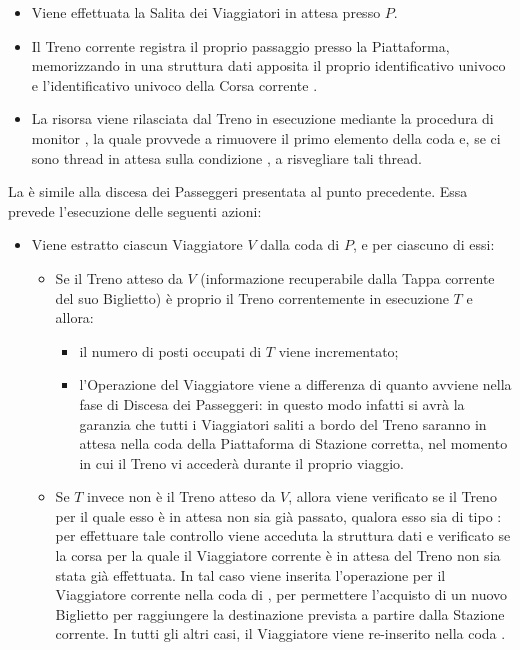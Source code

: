 \begin{description}
			\begin{itemize}
				\item Viene effettuata la Salita dei Viaggiatori in attesa presso $P$. 
				\item Il Treno corrente registra il proprio passaggio presso la Piattaforma, memorizzando in una struttura dati apposita  il proprio identificativo univoco e l'identificativo univoco della Corsa corrente .
				\item La risorsa viene rilasciata dal Treno in esecuzione mediante la procedura di monitor , la quale provvede a rimuovere il primo elemento della coda  e, se ci sono thread in attesa sulla condizione , a risvegliare tali thread.
			\end{itemize}
		
		La  è simile alla discesa dei Passeggeri presentata al punto precedente. Essa prevede l'esecuzione delle seguenti azioni:
		\begin{itemize}
			\item Viene estratto ciascun Viaggiatore $V$ dalla coda  di $P$, e per ciascuno di essi:
			\begin{itemize}
				\item Se il Treno atteso da $V$ (informazione recuperabile dalla Tappa corrente del suo Biglietto) è proprio il Treno correntemente in esecuzione $T$ e  allora:
					\begin{itemize}
						\item il numero di posti occupati di $T$ viene incrementato;
						\item l'Operazione  del Viaggiatore viene  a differenza di quanto avviene nella fase di Discesa dei Passeggeri: in questo modo infatti si avrà la garanzia che tutti i Viaggiatori saliti a bordo del Treno saranno in attesa nella coda  della Piattaforma di Stazione corretta, nel momento in cui il Treno vi accederà durante il proprio viaggio. 
					\end{itemize}
				\item Se $T$ invece non è il Treno atteso da $V$, allora viene verificato se il Treno per il quale esso è in attesa non sia già passato, qualora esso sia di tipo : per effettuare tale controllo viene acceduta la struttura dati  e verificato se la corsa per la quale il Viaggiatore corrente è in attesa del Treno non sia stata già effettuata. In tal caso viene inserita l'operazione  per il Viaggiatore corrente nella coda di , per permettere l'acquisto di un nuovo Biglietto per raggiungere la destinazione prevista a partire dalla Stazione corrente. In tutti gli altri casi, il Viaggiatore viene re-inserito nella coda .
			\end {itemize}
		\end{itemize}
	\end {description}

